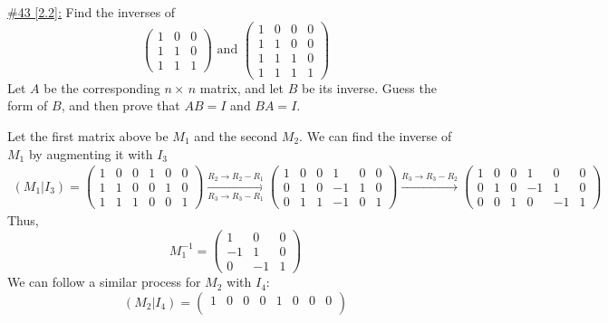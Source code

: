 \documentclass{exam}
\begin{document}
\underline{\#43 [2.2]:} Find the inverses of
\[
    \begin{pmatrix}
        1 & 0 & 0 \\
        1 & 1 & 0 \\
        1 & 1 & 1
    \end{pmatrix} 
    \text{ and }
    \begin{pmatrix}
        1 & 0 & 0 & 0 \\
        1 & 1 & 0 & 0 \\
        1 & 1 & 1 & 0 \\
        1 & 1 & 1 & 1 
    \end{pmatrix}
\]
Let $A$ be the corresponding $n\times\,n$ matrix, and let $B$ be its inverse. Guess the form of $B$, and then prove that $AB=I$ and $BA=I$.
\begin{solution}
    Let the first matrix above be $M_1$ and the second $M_2$. We can find the inverse of $M_1$ by augmenting it with $I_3$
    \begin{align*}
        (M_1 | I_3) = \begin{pmatrix}
            1 & 0 & 0 & 1 & 0 & 0 \\
            1 & 1 & 0 & 0 & 1 & 0 \\
            1 & 1 & 1 & 0 & 0 & 1 
        \end{pmatrix}
        \xrightarrow[R_3 \to R_3 - R_1]{R_2 \to R_2 - R_1}
        \begin{pmatrix}
            1 & 0 & 0 & 1 & 0 & 0 \\
            0 & 1 & 0 & -1 & 1 & 0 \\
            0 & 1 & 1 & -1 & 0 & 1 
        \end{pmatrix}
        \xrightarrow{R_3 \to R_3 - R_2}
        \begin{pmatrix}
            1 & 0 & 0 & 1 & 0 & 0 \\
            0 & 1 & 0 & -1 & 1 & 0 \\
            0 & 0 & 1 & 0 & -1 & 1 
        \end{pmatrix}
    \end{align*}
    Thus, 
    \[M_1^{-1} = \begin{pmatrix}
        1 & 0 & 0 \\
        -1 & 1 & 0 \\
        0 & -1 & 1
    \end{pmatrix}\]
    We can follow a similar process for $M_2$ with $I_4$:
    \[
        (M_2 | I_4) = \begin{pmatrix}
            1 & 0 & 0 & 0 & 1 & 0 & 0 & 0 \\

\end{pmatrix}\]
\end{solution}
\end{document}
